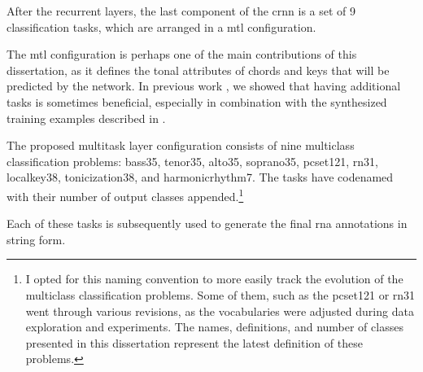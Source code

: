 
After the recurrent layers, the last component of the
\gls{crnn} is a set of 9 classification tasks, which are
arranged in a \gls{mtl} configuration. 

The \gls{mtl} configuration is perhaps one of the main
contributions of this dissertation, as it defines the tonal
attributes of chords and keys that will be predicted by the
network. In previous work
\parencite{napoleslopez2021augmentednet}, we showed that
having additional tasks is sometimes beneficial, especially
in combination with the synthesized training examples
described in .

The proposed multitask layer configuration consists of nine
multiclass classification problems: \gls{bass35},
\gls{tenor35}, \gls{alto35}, \gls{soprano35},
\gls{pcset121}, \gls{rn31}, \gls{localkey38},
\gls{tonicization38}, and \gls{harmonicrhythm7}. The tasks
have codenamed with their number of output classes
appended.\footnote{I opted for this naming convention to
more easily track the evolution of the multiclass
classification problems. Some of them, such as the
\gls{pcset121} or \gls{rn31} went through various revisions,
as the vocabularies were adjusted during data exploration
and experiments. The names, definitions, and number of
classes presented in this dissertation represent the latest
definition of these problems.}

Each of these tasks is subsequently used to generate the
final \gls{rna} annotations in string form.
